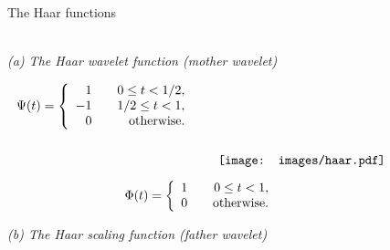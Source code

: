 \begin{figure}[H]
\caption{The Haar functions}\label{figure:haar}
\centering
\caption*{\\[1em]\footnotesize\emph{(a) The Haar wavelet function (mother
wavelet)}}
\[
\begin{aligned}
\Psi(t) = \left\{
	\begin{array}{r r}
		1  & \quad   0 \leq t < 1/2, \\
		-1 & \quad 1/2 \leq t < 1, \\
		0  & \quad \text{otherwise.}
	\end{array}
\right.
\end{aligned}
\qquad
\raisebox{-15mm}{\texttt{[image: images/haar.pdf]}}
\]
\caption*{\footnotesize\emph{(b) The Haar scaling function (father wavelet)}}
\[
\Phi(t) = \left\{
	\begin{array}{r r}
		1 & \quad 0 \leq t < 1, \\
		0 & \quad \text{otherwise.}
	\end{array}
\right.
\]
\end{figure}
